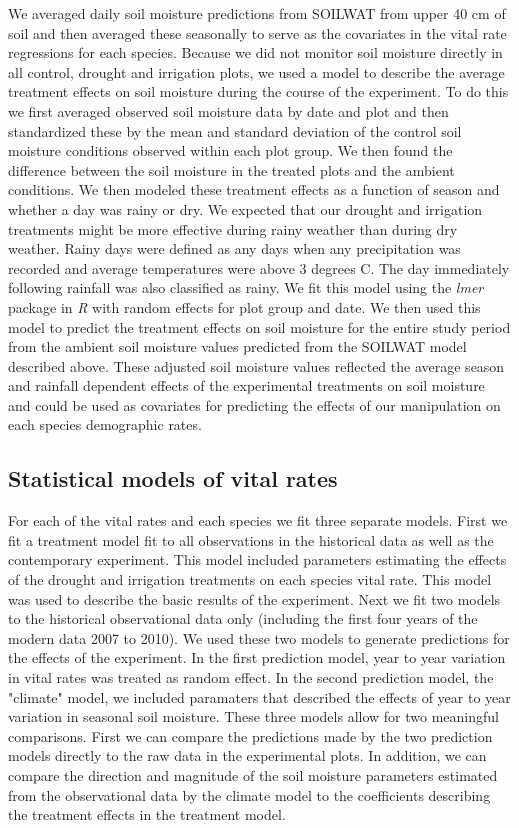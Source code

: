 \documentclass[11pt]{article}
\begin{document}
\begin{doublespacing}
We averaged daily soil moisture predictions from SOILWAT from upper 40 cm of soil and then averaged these seasonally to serve as the covariates in the vital rate regressions for each species. Because we did not monitor soil moisture directly in all control, drought and irrigation plots, we used a model to describe the average treatment effects on soil moisture during the course of the experiment. To do this we first averaged observed soil moisture data by date and plot and then standardized these by the mean and standard deviation of the control soil moisture conditions observed within each plot group. We then found the difference between the soil moisture in the treated plots and the ambient conditions. We then modeled these treatment effects as a function of season and whether a day was rainy or dry. We expected that our drought and irrigation treatments might be more effective during rainy weather than during dry weather. Rainy days were defined as any days when any precipitation was recorded and average temperatures were above 3 degrees C. The day immediately following rainfall was also classified as rainy. We fit this model using the \textit{lmer} package in \textit{R} \citep{bates} with random effects for plot group and date. We then used this model to predict the treatment effects on soil moisture for the entire study period from the ambient soil moisture values predicted from the SOILWAT model described above. These adjusted soil moisture values reflected the average season and rainfall dependent effects of the experimental treatments on soil moisture and could be used as covariates for predicting the effects of our manipulation on each species demographic rates. 


\subsection*{Statistical models of vital rates}

For each of the vital rates and each species we fit three separate models.  First we fit a treatment model fit to all observations in the historical data as well as the contemporary experiment.  This model included parameters estimating the effects of the drought and irrigation treatments on each species vital rate. This model was used to describe the basic results of the experiment. Next we fit two models to the historical observational data only (including the first four years of the modern data 2007 to 2010). We used these two models to generate predictions for the effects of the experiment. In the first prediction model, year to year variation in vital rates was treated as random effect. In the second prediction model, the "climate" model, we included paramaters that described the effects of year to year variation in seasonal soil moisture. These three models allow for two meaningful comparisons.  First we can compare the predictions made by the two prediction models directly to the raw data in the experimental plots.  In addition, we can compare the direction and magnitude of the soil moisture parameters estimated from the observational data by the climate model to the coefficients describing the treatment effects in the treatment model.      


\end{doublespacing}
\end{document}
